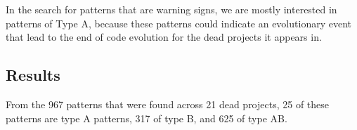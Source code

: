 \noindent
In the search for patterns that are warning signs, we are mostly interested in
patterns of Type A, because these patterns could indicate an evolutionary event
that lead to the end of code evolution for the dead projects it appears in.

\subsection{Results}
From the 967 patterns that were found across 21 dead projects, 25 of these
patterns are type A patterns, 317 of type B, and 625 of type AB.


\begin{comment}
- Execution of the research
- Phases, steps

This chapter reports on the execution of the research method as described in Chapter 3.

If the research has been divided into phases (e.g., using sub questions) the
phases are introduced, reported on and concluded individually. If needed this
Chapter could be split up to balance out the sizes of all Chapters.
An example Research Chapter is provided as Chapter 3 at Paul’s home
page\footnote{http://homepages.cwi.nl/~paulk/thesesMasterSoftwareEngineering/2006/ReneWiegers.pdf}.
\end{comment}
